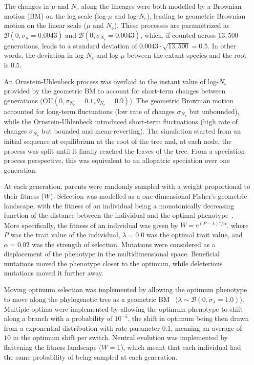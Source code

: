 \documentclass{article}
\newcommand{\Multiply}{\cdot}
\newcommand{\e}{\text{e}}
\newcommand{\Ne}{N_{\text{e}}}
\newcommand{\Trait}{P}
\newcommand{\MutationRatePheno}{\mu}
\newcommand{\brownian}{\mathcal{B}}
\begin{document}
\newpage

The changes in $\MutationRatePheno$ and $\Ne$ along the lineages were both modelled by a Brownian motion (BM) on the log scale (log-$\MutationRatePheno$ and log-$\Ne$), leading to geometric Brownian motion on the linear scale ($\MutationRatePheno$ and $\Ne$).
These processes are parametrized as $\brownian \left(0, \sigma_{\MutationRatePheno}=0.0043\right)$ and $\brownian \left(0, \sigma_{\Ne}=0.0043\right)$, which, if counted across $13,500$ generations, leads to a standard deviation of $0.0043 \Multiply \sqrt {13,500} = 0.5$.
In other words, the deviation in log-$\Ne$ and log-$\MutationRatePheno$  between the extant species and the root is $0.5$.

An Ornstein-Uhlenbeck process was overlaid to the instant value of log-$\Ne$ provided by the geometric BM to account for short-term changes between generations ($\text{OU} \left(0, \sigma_{\Ne}=0.1, \theta_{\Ne}=0.9\right)$).
The geometric Brownian motion accounted for long-term fluctuations (low rate of changes $\sigma_{\Ne}$ but unbounded), while the Ornstein-Uhlenbeck introduced short-term fluctuations (high rate of changes $\sigma_{\Ne}$ but bounded and mean-reverting).
The simulation started from an initial sequence at equilibrium at the root of the tree and, at each node, the process was split until it finally reached the leaves of the tree.
From a speciation process perspective, this was equivalent to an allopatric speciation over one generation.

At each generation, parents were randomly sampled with a weight proportional to their fitness ($W$).
Selection was modelled as a one-dimensional Fisher's geometric landscape, with the fitness of an individual being a monotonically decreasing function of the distance between the individual and the optimal phenotype~\citep{tenaillon_utility_2014,blanquart_epistasis_2016}.
More specifically, the fitness of an individual was given by $W = \e^{(\Trait - \lambda)^2/ \alpha}$, where $\Trait$ was the trait value of the individual, $\lambda=0.0$ was the optimal trait value, and $\alpha=0.02$ was the strength of selection.
Mutations were considered as a displacement of the phenotype in the multidimensional space.
Beneficial mutations moved the phenotype closer to the optimum, while deleterious mutations moved it further away.

Moving optimum selection was implemented by allowing the optimum phenotype to move along the phylogenetic tree as a geometric BM~\citep{hansen_stabilizing_1997} ($\lambda \sim \brownian \left(0, \sigma_{\lambda}=1.0\right)$).
Multiple optima were implemented by allowing the optimum phenotype to shift along a branch with a probability of $10^{-5}$, the shift in optimum being then drawn from a exponential distribution with rate parameter $0.1$, meaning an average of $10$ in the optimum shift per switch.
Neutral evolution was implemented by flattening the fitness landscape ($W=1$), which meant that each individual had the same probability of being sampled at each generation.
\end{document}
